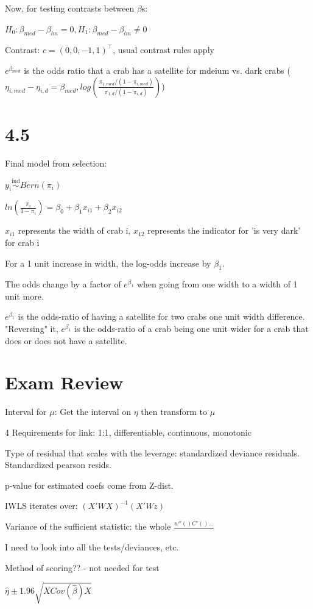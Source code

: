 \documentclass{article}
\newcommand{\inddist}{\overset{\mathrm{ind}}{\sim}}
\begin{document}
Now, for testing contrasts between $\beta$s:

$H_0: \beta_{med} - \beta_{lm} = 0, H_1: \beta_{med} - \beta_{lm} \neq 0$

Contrast: $c = (0, 0, -1, 1)^{\top}$, usual contrast rules apply

$e^{\beta_{med}}$ is the odds ratio that a crab has a satellite for mdeium vs. dark crabs ($\eta_{i,med} - \eta_{i,d} = \beta_{med}, log(\frac{\pi_{1,med}/(1-\pi_{i,med})}{\pi_{1,d}/(1-\pi_{i,d})})$)

\section{4.5} 

Final model from selection:

$y_i \inddist Bern(\pi_i)$

$ln(\frac{\pi_i}{1-\pi_i}) = \beta_0 + \beta_1x_{i1} + \beta_2x_{i2}$

$x_{i1}$ represents the width of crab i, $x_{12}$ represents the indicator for 'is very dark' for crab i

For a 1 unit increase in width, the log-odds increase by $\beta_1$.

The odds change by a factor of $e^{\beta_1}$ when going from one width to a width of 1 unit more.

$e^{\beta_1}$ is the odds-ratio of having a satellite for two crabs one unit width difference. "Reversing" it, $e^{\beta_1}$ is the odds-ratio of a crab being one unit wider for a crab that does or does not have a satellite.

\section{Exam Review}

Interval for $\mu$: Get the interval on $\eta$ then transform to $\mu$

4 Requirements for link: 1:1, differentiable, continuous, monotonic

Type of residual that scales with the leverage: standardized deviance residuals. Standardized pearson resids. 

p-value for estimated coefs come from Z-dist. 

IWLS iterates over: $(X'WX)^{-1}(X'Wz)$

Variance of the sufficient statistic: the whole $\frac{w''()C'()...}{}$

I need to look into all the tests/deviances, etc. 

Method of scoring?? - not needed for test


$\hat{\eta} \pm 1.96 \sqrt{X Cov(\hat{\beta})X}$
\end{document}
